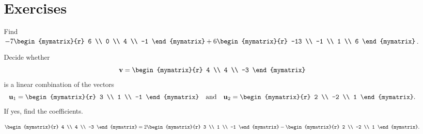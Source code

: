 \section*{Exercises}

\begin{ex}
  Find $-7\begin{mymatrix}{r}
    6 \\
    0 \\
    4 \\
    -1
  \end{mymatrix}
  + 6\begin{mymatrix}{r}
    -13 \\
    -1 \\
    1 \\
    6
  \end{mymatrix}$.
\end{ex}

\begin{ex}
  Decide whether
  \begin{equation*}
    \vect{v}= \begin{mymatrix}{r}
      4 \\
      4 \\
      -3
    \end{mymatrix}
  \end{equation*}
  is a linear combination of the vectors
  \begin{equation*}
    \vect{u}_1 = \begin{mymatrix}{r}
      3 \\
      1 \\
      -1
    \end{mymatrix}
    \quad\mbox{and}\quad
    \vect{u}_2 =
    \begin{mymatrix}{r}
      2 \\
      -2 \\
      1
    \end{mymatrix}.
  \end{equation*}
  If yes, find the coefficients.

  \begin{sol}
    \begin{equation*}
      \begin{mymatrix}{r}
        4 \\
        4 \\
        -3
      \end{mymatrix}
      =
      2
      \begin{mymatrix}{r}
        3 \\
        1 \\
        -1
      \end{mymatrix}
      -
      \begin{mymatrix}{r}
        2 \\
        -2 \\
        1
      \end{mymatrix}.
    \end{equation*}
  \end{sol}
\end{ex}

